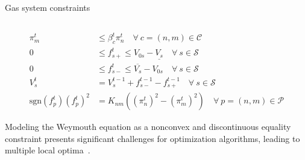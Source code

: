 \documentclass[hyperref={colorlinks,citecolor=blue,linkcolor=blue,urlcolor=blue}]{beamer}
\begin{document}
\begin{frame}{Gas system constraints}
\begin{columns}
\begin{column}{0.5\textwidth}
\begin{fleqn}[0pt]
\begin{subequations}
\begin{align}
    \pi_{m}^t & \leq \beta_{c}^t{\pi_{n}^t} \quad \forall \ c=(n,m) \in \mathcal{C} \label{eq:comp_ratio} \\
    0  & \leq f_{s+}^t \leq V_{0s} - \underline{V_s} \quad \forall \ s \in \mathcal{S} \label{eq:sto_limit1} \\
    0 & \leq f_{s-}^t \leq \overline{V_s} - V_{0s} \quad \forall \ s \in \mathcal{S} \label{eq:sto_limit2} \\
    V_{s}^t & = V_{s}^{t-1} + f_{s-}^{t-1} - f_{s+}^{t-1} \quad \forall \ s \in \mathcal{S} \label{eq:sto_time} \\ 
    \text{sgn}(f_{p}^t)(f_{p}^t)^2 & = K_{nm}((\pi_{n}^t)^2 - (\pi_{m}^t)^2) \quad \forall \ p =(n,m) \in \mathcal{P} \label{eq:weymouth}
\end{align}
\end{subequations}
\end{fleqn}
Modeling the Weymouth equation as a nonconvex and discontinuous equality constraint presents significant challenges for optimization algorithms, leading to multiple local optima~\cite{JIANG2021106460}.

\end{column}
\end{columns}


\end{frame}
%
\end{document}
